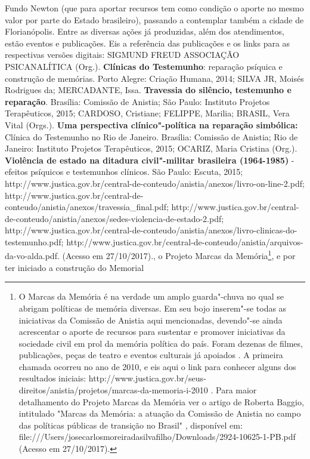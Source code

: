 {  Fundo Newton (que para aportar recursos tem como condição o aporte no
  mesmo valor por parte do Estado brasileiro), passando a contemplar
  também a cidade de Florianópolis. Entre as diversas ações já
  produzidas, além dos atendimentos, estão eventos e publicações. Eis a
  referência das publicações e os links para as respectivas versões
  digitais: SIGMUND FREUD ASSOCIAÇÃO PSICANALÍTICA (Org.).
  \textbf{Clínicas do Testemunho}: reparação psíquica e construção de
  memórias. Porto Alegre: Criação Humana, 2014; SILVA JR, Moisés
  Rodrigues da; MERCADANTE, Issa. \textbf{Travessia do silêncio,
  testemunho e reparação}. Brasília: Comissão de Anistia; São Paulo:
  Instituto Projetos Terapêuticos, 2015; CARDOSO, Cristiane; FELIPPE,
  Marilia; BRASIL, Vera Vital (Orgs.). \textbf{Uma perspectiva
  clínico"-política na reparação simbólica:} Clínica do Testemunho no Rio
  de Janeiro. Brasília: Comissão de Anistia; Rio de Janeiro: Instituto
  Projetos Terapêuticos, 2015; OCARIZ, Maria Cristina (Org.).
  \textbf{Violência de estado na ditadura civil"-militar brasileira
  (1964-1985)} - efeitos psíquicos e testemunhos clínicos. São Paulo:
  Escuta, 2015;
  http://www.justica.gov.br/central-de-conteudo/anistia/anexos/livro-on-line-2.pdf;
  http://www.justica.gov.br/central-de-conteudo/anistia/anexos/travessia\_final.pdf;
  http://www.justica.gov.br/central-de-conteudo/anistia/anexos/sedes-violencia-de-estado-2.pdf;
  http://www.justica.gov.br/central-de-conteudo/anistia/anexos/livro-clinicas-do-testemunho.pdf;
  http://www.justica.gov.br/central-de-conteudo/anistia/arquivos-da-vo-alda.pdf.
  (Acesso em 27/10/2017).}, o Projeto Marcas da Memória\footnote{O
  Marcas da Memória é na verdade um amplo guarda"-chuva no qual se
  abrigam políticas de memória diversas. Em seu bojo inserem"-se todas as
  iniciativas da Comissão de Anistia aqui mencionadas, devendo"-se ainda
  acrescentar o aporte de recursos para sustentar e promover iniciativas
  da sociedade civil em prol da memória política do país. Foram dezenas
  de filmes, publicações, peças de teatro e eventos culturais já
  apoiados . A primeira chamada ocorreu no ano de 2010, e eis aqui o
  link para conhecer alguns dos resultados iniciais:
  http://www.justica.gov.br/seus-direitos/anistia/projetos/marcas-da-memoria-i-2010
  . Para maior detalhamento do Projeto Marcas da Memória ver o artigo de
  Roberta Baggio, intitulado "Marcas da Memória: a atuação da Comissão
  de Anistia no campo das políticas públicas de transição no Brasil" ,
  disponível em:
  file:///Users/josecarlosmoreiradasilvafilho/Downloads/2924-10625-1-PB.pdf
  (Acesso em 27/10/2017).}, e por ter iniciado a construção do Memorial
